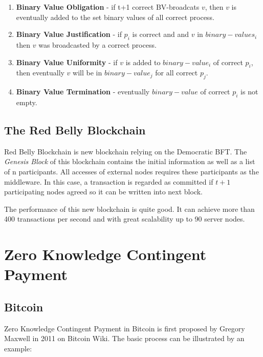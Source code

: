 \documentclass[12pt]{article}
\begin{document}
\begin{enumerate}
    \item \textbf{Binary Value Obligation} - if t+1 correct BV-broadcats $v$, then $v$ is eventually added to the set binary values of all correct process.
    \item \textbf{Binary Value Justification} - if $p_i$ is correct and and $v$ in $binary-values_i$ then $v$ was broadcasted by a correct process.
    \item \textbf{Binary Value Uniformity} - if $v$ is added to $binary-value_i$ of correct $p_i$, then eventually $v$ will be in $binary-value_j$ for all correct $p_j$.
    \item \textbf{Binary Value Termination} - eventually $binary-value$ of correct $p_i$ is not empty. 
\end{enumerate}

\subsection{The Red Belly Blockchain}

Red Belly Blockchain is new blockchain relying on the Democratic BFT. The \textit{Genesis Block} of this blockchain contains the initial information as well as a list of n participants. All accesses of external nodes requires these participants as the middleware. In this case, a transaction is regarded as committed if $t+1$ participating nodes agreed so it can be written into next block.

The performance of this new blockchain is quite good. It can achieve more than 400 transactions per second and with great scalability up to 90 server nodes.

\section{Zero Knowledge Contingent Payment}
\label{sec:Zero Knowledge Contingent Payment}

\subsection{Bitcoin}

Zero Knowledge Contingent Payment in Bitcoin is first proposed by Gregory Maxwell in 2011 on Bitcoin Wiki\cite{maxwell5zero}. The basic process can be illustrated by an example\cite{campanelli2017zero}:
\end{document}

